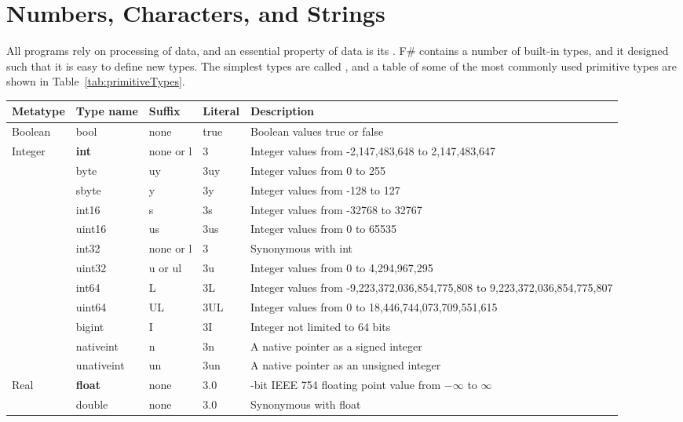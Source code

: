 \chapter{Numbers, Characters, and Strings}
All programs rely on processing of data, and an essential property of data is its . F\# contains a number of built-in types, and it designed such that it is easy to define new types. The simplest types are called , and a table of some of the most commonly used primitive types are shown in Table~\ref{tab:primitiveTypes}.
\begin{table}
  \centering
  \begin{tabularx}{\textwidth}{|l|l|l|l|>{\raggedright\arraybackslash}X|}
    \hline
    Metatype & Type name & Suffix & Literal & Description\\
    \hline
    Boolean & bool & none & true & Boolean values true or false \\
    \hline
    Integer & \textbf{int} & none or l & 3 & Integer values from -2,147,483,648 to 2,147,483,647 \\
             &byte & uy  & 3uy &Integer values from 0 to 255\\
             &sbyte & y & 3y &Integer values from -128 to 127\\
             &int16 & s  & 3s &Integer values from -32768 to 32767\\
             &uint16 & us & 3us &Integer values from 0 to 65535\\
             &int32 & none or l  & 3 &Synonymous with int\\
             &uint32 & u or ul  & 3u & Integer values from 0 to 4,294,967,295\\
             &int64 & L  & 3L &Integer values from -9,223,372,036,854,775,808 to 9,223,372,036,854,775,807\\
             &uint64 & UL  & 3UL &Integer values from 0 to 18,446,744,073,709,551,615\\
             &bigint & I & 3I &Integer not limited to 64 bits\\
             &nativeint & n & 3n &A native pointer as a signed integer\\
             &unativeint & un  &3un &A native pointer as an unsigned integer\\
    \hline
    Real & \textbf{float} & none  & 3.0 & 64-bit IEEE 754 floating point value from $-\infty$ to $\infty$\\
             & double &none & 3.0 & Synonymous with float\\

\end{tabularx}
\end{table}
